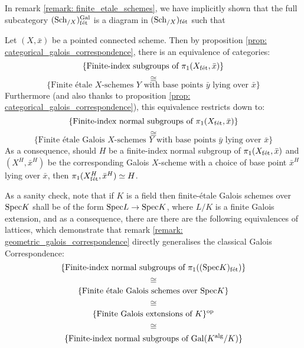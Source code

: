         \begin{remark} \label{remark: etale_fundamental_groups_as_automorphism_groups_of_universal_covers}
            In remark \ref{remark: finite_etale_schemes}, we have implicitly shown that the full subcategory $(\mathrm{Sch}_{/X})_{\mathrm{f\acute{e}t}}^{\mathrm{Gal}}$ is a diagram in $(\mathrm{Sch}_{/X})_{\mathrm{f\acute{e}t}}$ such that  
        \end{remark}
        \begin{remark} \label{remark: geometric_galois_correspondence}
            Let $(X, \bar{x})$ be a pointed connected scheme. Then by proposition \ref{prop: categorical_galois_correspondence}, there is an equivalence of categories:
                $$\{\text{Finite-index subgroups of $\pi_1(X_{\mathrm{f\acute{e}t}}, \bar{x})$}\}$$
                $$\cong$$
                $$\{\text{Finite \'etale $X$-schemes $Y$ with base points $\bar{y}$ lying over $\bar{x}$}\}$$
            Furthermore (and also thanks to proposition \ref{prop: categorical_galois_correspondence}), this equivalence restricts down to:
                $$\{\text{Finite-index normal subgroups of $\pi_1(X_{\mathrm{f\acute{e}t}}, \bar{x})$}\}$$
                $$\cong$$
                $$\{\text{Finite \'etale Galois $X$-schemes $Y$ with base points $\bar{y}$ lying over $\bar{x}$}\}$$
            As a consequence, should $H$ be a finite-index normal subgroup of $\pi_1(X_{\mathrm{f\acute{e}t}}, \bar{x})$ and $(X^H, \bar{x}^H)$ be the corresponding Galois $X$-scheme with a choice of base point $\bar{x}^H$ lying over $\bar{x}$, then $\pi_1(X^H_{\mathrm{f\acute{e}t}}, \bar{x}^H) \simeq H$. 
        \end{remark}
        \begin{example} \label{example: etale_fundamental_group_of_a_field}
            As a sanity check, note that if $K$ is a field then finite-\'etale Galois schemes over $\mathrm{Spec} K$ shall be of the form $\mathrm{Spec} L \to \mathrm{Spec} K$, where $L/K$ is a finite Galois extension, and as a consequence, there are there are the following equivalences of lattices, which demonstrate that remark \ref{remark: geometric_galois_correspondence} directly generalises the classical Galois Correspondence:
                $$\{\text{Finite-index normal subgroups of $\pi_1((\mathrm{Spec} K)_{\mathrm{f\acute{e}t}})$}\}$$
                $$\cong$$
                $$\{\text{Finite \'etale Galois schemes over $\mathrm{Spec} K$}\}$$
                $$\cong$$
                $$\{\text{Finite Galois extensions of $K$}\}^{\mathrm{op}}$$
                $$\cong$$
                $$\{\text{Finite-index normal subgroups of $\mathrm{Gal}(K^{\mathrm{alg}}/K)$}\}$$
        \end{example}
